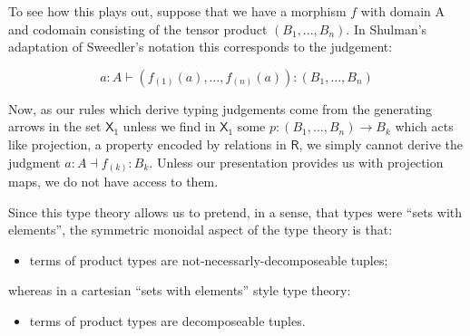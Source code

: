 \documentclass[pra,floatfix,
amsmath,superscriptaddress, 12pt]{article}
\theoremstyle{definition}
\newcommand{\cG}{\mathcal{G}}
\newcommand{\msf}[1]{\mathsf{#1}}
\begin{document}
To see how this plays out, suppose that we have a morphism $f$ with domain A and codomain consisting of the tensor product $(B_1,...,B_n)$. In Shulman's adaptation of Sweedler's notation this corresponds to the judgement:

\[
a:A\vdash\left(f_{\left(1\right)}\left(a\right),\dots,f_{\left(n\right)}\left(a\right)\right):\left(B_{1},\dots,B_{n}\right)
\]

Now, as our rules which derive typing judgements come from the generating arrows in the set $\msf{X}_1$ unless we find in $\msf{X}_1$ some $p:(B_1,\dots,B_n) \rightarrow B_k$ which acts like projection, a property encoded by relations in $\msf{R}$, we simply cannot derive the judgment $a:A \dashv f_{(k)}:B_k$. Unless our presentation provides us with projection maps, we do not have access to them.

Since this type theory allows us to pretend, in a sense, that types were ``sets with elements'', the symmetric monoidal aspect of the type theory is that:
\begin{itemize}
    \item terms of product types are not-necessarly-decomposeable tuples;
\end{itemize}
whereas in a cartesian ``sets with elements'' style type theory:
\begin{itemize}
    \item terms of product types are decomposeable tuples.
\end{itemize}







\end{document}
